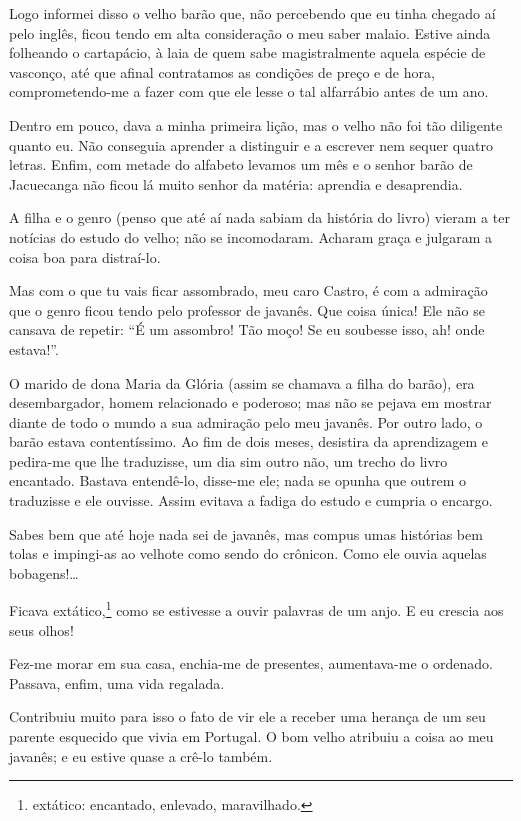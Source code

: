 Logo informei disso o velho barão que, não percebendo que eu tinha
chegado aí pelo inglês, ficou tendo em alta consideração o meu saber
malaio. Estive ainda folheando o cartapácio, à laia de quem sabe
magistralmente aquela espécie de vasconço, até que afinal contratamos as
condições de preço e de hora, comprometendo-me a fazer com que ele lesse
o tal alfarrábio antes de um ano.

Dentro em pouco, dava a minha primeira lição, mas o velho não foi tão
diligente quanto eu. Não conseguia aprender a distinguir e a escrever
nem sequer quatro letras. Enfim, com metade do alfabeto levamos um mês e
o senhor barão de Jacuecanga não ficou lá muito senhor da matéria:
aprendia e desaprendia.

A filha e o genro (penso que até aí nada sabiam da história do livro)
vieram a ter notícias do estudo do velho; não se incomodaram. Acharam
graça e julgaram a coisa boa para distraí-lo.

Mas com o que tu vais ficar assombrado, meu caro Castro, é com a
admiração que o genro ficou tendo pelo professor de javanês. Que coisa
única! Ele não se cansava de repetir: ``É um assombro! Tão moço! Se eu
soubesse isso, ah! onde estava!''.

O marido de dona Maria da Glória (assim se chamava a filha do barão),
era desembargador, homem relacionado e poderoso; mas não se pejava em
mostrar diante de todo o mundo a sua admiração pelo meu javanês. Por
outro lado, o barão estava contentíssimo. Ao fim de dois meses,
desistira da aprendizagem e pedira-me que lhe traduzisse, um dia sim
outro não, um trecho do livro encantado. Bastava entendê-lo, disse-me
ele; nada se opunha que outrem o traduzisse e ele ouvisse. Assim evitava
a fadiga do estudo e cumpria o encargo.

Sabes bem que até hoje nada sei de javanês, mas compus umas histórias
bem tolas e impingi-as ao velhote como sendo do crônicon. Como ele ouvia
aquelas bobagens!\ldots{}

Ficava extático,\footnote{extático: encantado, enlevado, maravilhado.}
como se estivesse a ouvir palavras de um anjo. E eu crescia aos seus
olhos!

Fez-me morar em sua casa, enchia-me de presentes, aumentava-me o
ordenado. Passava, enfim, uma vida regalada.

Contribuiu muito para isso o fato de vir ele a receber uma herança de um
seu parente esquecido que vivia em Portugal. O bom velho atribuiu a
coisa ao meu javanês; e eu estive quase a crê-lo também.

